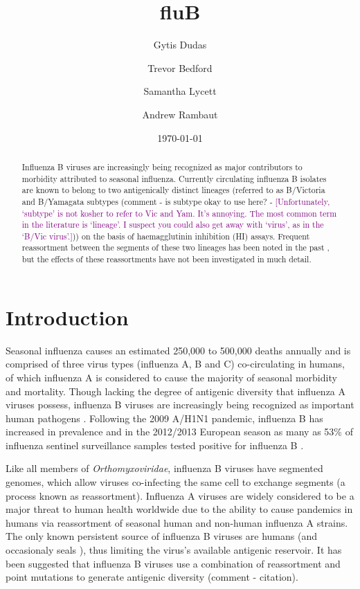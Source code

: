 \documentclass[11pt,oneside,letterpaper]{article}
\title{\vspace{1.0cm} \LARGE \bf fluB}
\author[1]{Gytis Dudas}
\author[2]{Trevor Bedford}
\author[1]{Samantha Lycett}
\author[1,3]{Andrew Rambaut}
\affil[1]{Institute of Evolutionary Biology, University of Edinburgh, Edinburgh, UK}
\affil[2]{Vaccine and Infectious Disease Division, Fred Hutchinson Cancer Research Center, Seattle, WA, USA.}
\affil[3]{Fogarty International Center, National Institutes of Health, Bethesda, MD, USA.}
\date{\today}
\def\tbc#1{\textcolor{purple}{[#1]}}
\begin{document}
\maketitle

\begin{abstract}

Influenza B viruses are increasingly being recognized as major contributors to morbidity attributed to seasonal influenza. 
Currently circulating influenza B isolates are known to belong to two antigenically distinct lineages (referred to as B/Victoria and B/Yamagata subtypes (comment - is subtype okay to use here? - \tbc{Unfortunately, `subtype' is not kosher to refer to Vic and Yam.  It's annoying.  The most common term in the literature is `lineage'.  I suspect you could also get away with `virus', as in the `B/Vic virus'.})) on the basis of haemagglutinin inhibition (HI) assays. 
Frequent reassortment between the segments of these two lineages has been noted in the past \cite{lindstrom1999}, but the effects of these reassortments have not been investigated in much detail.

\end{abstract}

\pagebreak


\section*{Introduction}
Seasonal influenza causes an estimated 250,000 to 500,000 deaths annually and is comprised of three virus types (influenza A, B and C) co-circulating in humans, of which influenza A is considered to cause the majority of seasonal morbidity and mortality.
Though lacking the degree of antigenic diversity that influenza A viruses possess, influenza B viruses are increasingly being recognized as important human pathogens \cite{paul-glezen2013}.
Following the 2009 A/H1N1 pandemic, influenza B has increased in prevalence and in the 2012/2013 European season as many as 53\% of influenza sentinel surveillance samples tested positive for influenza B \cite{ECDC1213}. 

Like all members of \textit{Orthomyxoviridae}, influenza B viruses have segmented genomes, which allow viruses co-infecting the same cell to exchange segments (a process known as reassortment). 
Influenza A viruses are widely considered to be a major threat to human health worldwide due to the ability to cause pandemics in humans via reassortment of seasonal human and non-human influenza A strains. 
The only known persistent source of influenza B viruses are humans (and occasionaly seals \cite{osterhaus2000}), thus limiting the virus's available antigenic reservoir. 
It has been suggested that influenza B viruses use a combination of reassortment and point mutations to generate antigenic diversity (comment - citation).
\end{document}
